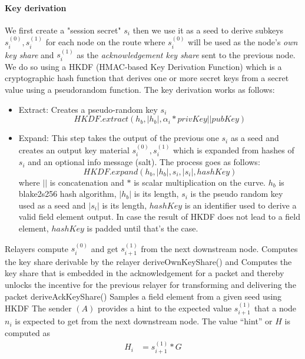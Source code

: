     \paragraph{Key derivation}
    We first create a "session secret" $s_i$ then we use it as a seed to derive subkeys $s_i^{(0)},s_i^{(1)}$ for each node on the route where $s_i^{(0)}$ will be used as the node's \textit{own key share} and $s_i^{(1)}$ as the \textit{acknowledgement key share} sent to the previous node. We do so using a HKDF (HMAC-based Key Derivation Function) which is a cryptographic hash function that derives one or more secret keys from a secret value using a pseudorandom function. The key derivation works as follows:
    \begin{itemize}
        \item Extract: Creates a pseudo-random key $s_i$   
        $$HKDF.extract(h_b, |h_b|, \alpha_i* privKey || pubKey)$$   

        \item Expand: This step takes the output of the previous one $s_i$ as a seed and creates an output key material $s_i^{(0)},s_i^{(1)}$ which is expanded from hashes of $s_i$ and an optional info message (salt). The process goes as follows:
        $$HKDF.expand(h_b, |h_b|,s_i, |s_i|, hashKey)$$
        where $||$ is concatenation and $*$ is scalar multiplication on the curve. $h_b$ is blake2s256 hash algorithm, $|h_b|$ is its length, $s_i$ is the pseudo random key used as a seed and $|s_i|$ is its length, $hashKey$ is an identifier used to derive a valid field element output. In case the result of HKDF does not lead to a field element, $hashKey$ is padded until that's the case.
      

    \end{itemize}
 Relayers compute $s_i^{(0)}$ and get $s_{i+1}^{(1)}$ from the next downstream node.
 Computes the key share derivable by the relayer deriveOwnKeyShare() 
 and  Computes the key share that is embedded in the acknowledgement
 for a packet and thereby unlocks the incentive for the previous
  relayer for transforming and delivering the packet deriveAckKeyShare() Samples a field element from a given seed using HKDF
    \newline The sender $(A)$ provides a hint to the expected value $s_{i+1}^{(1)}$ that a node $n_i$ is expected to get from the next downstream node.
    The value “hint” or $H$ is computed as 
    \begin{align}  
        H_i&=s_{i+1}^{(1)}*G
         \end{align}
